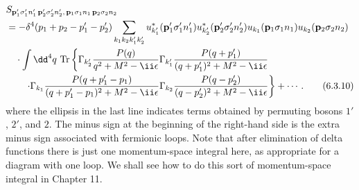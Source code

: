 \begin{align}
&S_{\mathbf p'_1\sigma'_1n'_1\,\mathbf p'_2\sigma'_2n'_2,\,
\mathbf p_1\sigma_1n_1\,\mathbf p_2\sigma_2n_2}\notag\\
&=-\delta^4(p_1+p_2-p'_1-p'_2)
\sum_{k_1k_2k'_1k'_2}
u_{k'_1}^*(\mathbf p'_1\sigma'_1n'_1)
u_{k'_2}^*(\mathbf p'_2\sigma'_2n'_2)
u_{k_1}(\mathbf p_1\sigma_1n_1)u_{k_2}(\mathbf p_2\sigma_2n_2)\notag\\
&\quad\cdot\int \dd^4q\,\operatorname{Tr}\left\{
\Gamma_{k'_2}\frac{P(q)}{q^2+M^2-\ii\epsilon}
\Gamma_{k'_1}\frac{P(q+p'_1)}{(q+p'_1)^2+M^2-\ii\epsilon}\right.\notag\\
&\qquad\left.\cdot
\Gamma_{k_1}\frac{P(q+p'_1-p_1)}{(q+p'_1-p_1)^2+M^2-\ii\epsilon}
\Gamma_{k_2}\frac{P(q-p'_2)}{(q-p'_2)^2+M^2-\ii\epsilon}
\right\}+\cdots.
\tag{6.3.10}
\label{eq:6.3.10}
\end{align}
where the ellipsis in the last line indicates terms obtained by permuting
bosons $1'$, $2'$, and $2$. The minus sign at the beginning of the right-hand
side is the extra minus sign associated with fermionic loops. Note that after
elimination of delta functions there is just one momentum-space integral here,
as appropriate for a diagram with one loop. We shall see how to do this sort of
momentum-space integral in Chapter 11.

